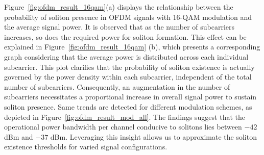 Figure~\ref{fig:ofdm_result_16qam}(a) displays the relationship between the probability of soliton presence in OFDM signals with 16-QAM modulation and the average signal power. It is observed that as the number of subcarriers increases, so does the required power for soliton formation. This effect can be explained in Figure~\ref{fig:ofdm_result_16qam} (b), which presents a corresponding graph considering that the average power is distributed across each individual subcarrier. This plot clarifies that the probability of soliton existence is actually governed by the power density within each subcarrier, independent of the total number of subcarriers. Consequently, an augmentation in the number of subcarriers necessitates a proportional increase in overall signal power to sustain soliton presence. Same trends are detected for different modulation schemes, as depicted in Figure~\ref{fig:ofdm_result_mod_all}. The findings suggest that the operational power bandwidth per channel conducive to solitons lies between \(-42\) dBm and \(-37\) dBm. Leveraging this insight allows us to approximate the soliton existence thresholds for varied signal configurations.


